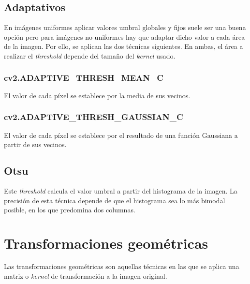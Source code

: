 \subsection{Adaptativos}
En imágenes uniformes aplicar valores umbral globales y fijos suele
ser una buena opción pero para imágenes no uniformes hay que adaptar
dicho valor a cada área de la imagen. Por ello, se aplican las dos
técnicas siguientes. En ambas, el área a realizar el \emph{threshold}
depende del tamaño del \emph{kernel} usado.

\subsubsection{cv2.ADAPTIVE\_THRESH\_MEAN\_C}
El valor de cada píxel se establece por la media de sus vecinos.

\subsubsection{cv2.ADAPTIVE\_THRESH\_GAUSSIAN\_C}
El valor de cada píxel se establece por el resultado de una función
Gaussiana a partir de sus vecinos.

\subsection{ Otsu}
Este \emph{threshold} calcula el valor umbral a partir del histograma
de la imagen. La precisión de esta técnica depende de que el
histograma sea lo más bimodal posible, en los que predomina dos
columnas.

\section{Transformaciones geométricas}
Las transformaciones geométricas son aquellas técnicas en las que se
aplica una matriz o \emph{kernel} de transformación a la imagen
original.
